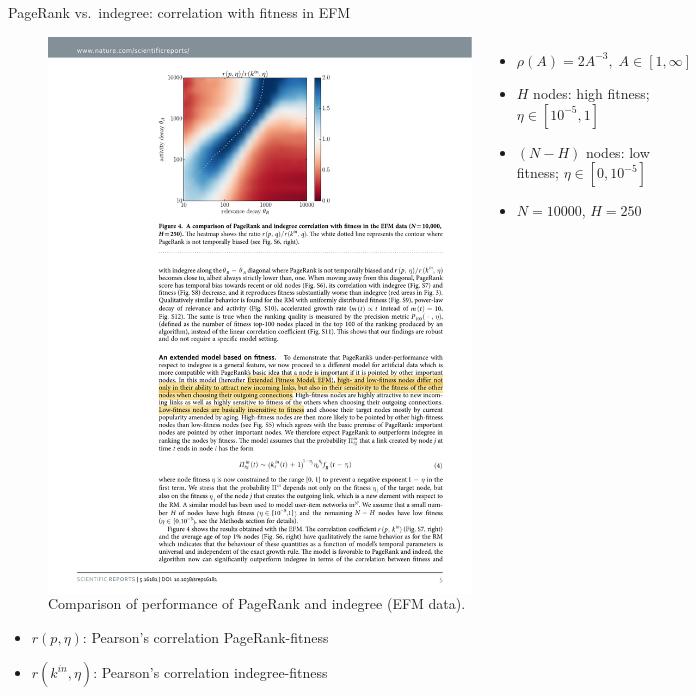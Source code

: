 \documentclass[utf8]{beamer}
\begin{document}
\begin{frame}{PageRank vs.\ indegree: correlation with fitness in EFM}
    \begin{figure}
        \begin{columns}

            \includegraphics[width=1.0\textwidth]{figures/PageRankEFM_heatmap}

            \caption{Comparison of performance of PageRank and indegree (EFM data).}

            \begin{footnotesize}
            \begin{itemize}
                \item $\rho(A) = 2A^{-3}, \; A \in [1, \infty]$
                \item $H$ nodes: high fitness; $\eta \in [10^{-5}, 1]$
                \item $(N-H)$ nodes: low fitness; $\eta \in [0, 10^{-5}]$
                \item $N=10000$, $H=250$
            \end{itemize}
            \end{footnotesize}
        \end{columns}
    \end{figure}
    \begin{itemize}
        \item $r(p, \eta)$: Pearson's correlation PageRank-fitness
        \item $r(k^{in}, \eta)$: Pearson's correlation indegree-fitness
    \end{itemize}
\end{frame}

\end{document}
